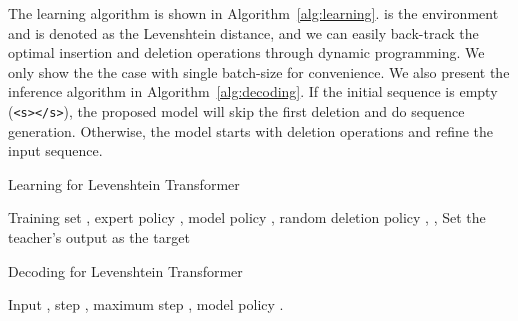 \documentclass{article}
\begin{document}
The learning algorithm is shown in Algorithm~\ref{alg:learning}.  is the environment and  is denoted as the Levenshtein distance, and we can easily back-track the optimal insertion and deletion operations
through dynamic programming. We only show the the case with single batch-size for convenience.
We also present the inference algorithm in Algorithm~\ref{alg:decoding}. If the initial sequence 
is empty (\texttt{<s></s>}), the
proposed model will skip the first deletion and do sequence generation. Otherwise, the model starts
with deletion operations and refine the input sequence.

\begin{algorithm}[htpb]
	  \caption{Learning for Levenshtein Transformer}
  		\label{alg:learning}
\begin{algorithmic}
 Training set , expert policy , model policy , random deletion policy , , 
\REPEAT
		\STATE Set the teacher's output as the target {}
	\ENDIF
	\IF {}
	\ELSE
	\ENDIF
	\IF {}
	    \STATE {}
	\ELSE 
	\ENDIF
	\STATE {}
    \STATE 
{}
\end{algorithmic}
\end{algorithm}
\begin{algorithm}[htpb]
  \caption{Decoding for Levenshtein Transformer}
  \label{alg:decoding}
\begin{algorithmic}
   Input , step , maximum step , model policy .
  \REPEAT
  \IF{}
  \ELSE
\ENDIF
  \ENDIF
\IF {}
  \ENDIF
  \IF {}
  \ELSE
\ENDIF
\end{algorithmic}
\end{algorithm}
\end{document}
